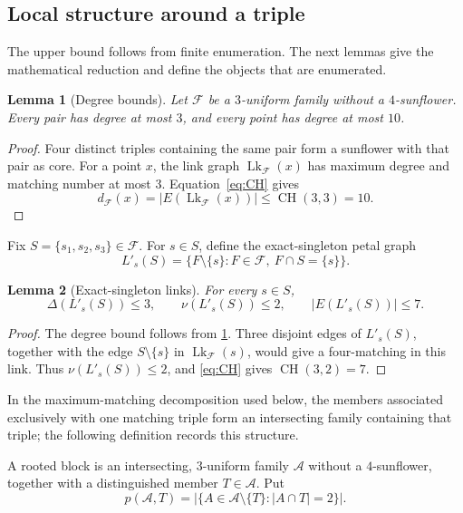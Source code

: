 \documentclass[11pt]{article}
\numberwithin{equation}{section}
\newtheorem{lemma}[lemma]{Lemma}
\theoremstyle{definition}
\theoremstyle{remark}
\newcommand{\F}{\mathcal F}
\newcommand{\A}{\mathcal A}
\newcommand{\CH}{\operatorname{CH}}
\newcommand{\Lk}{\operatorname{Lk}}
\begin{document}
\subsection{Local structure around a triple}

The upper bound follows from finite enumeration. The next lemmas give the
mathematical reduction and define the objects that are enumerated.

\begin{lemma}[Degree bounds]
\label{lem:f34-degrees}
Let $\F$ be a $3$-uniform family without a $4$-sunflower. Every pair has
degree at most $3$, and every point has degree at most $10$.
\end{lemma}

\begin{proof}
Four distinct triples containing the same pair form a sunflower with that pair
as core. For a point $x$, the link graph $\Lk_{\F}(x)$ has maximum degree and
matching number at most $3$. Equation~\eqref{eq:CH} gives
\[
 d_{\F}(x)=|E(\Lk_{\F}(x))|\le\CH(3,3)=10.
\]
\end{proof}

Fix $S=\{s_1,s_2,s_3\}\in\F$. For $s\in S$, define the exact-singleton
petal graph
\[
 L'_s(S)=\{F\setminus\{s\}:F\in\F,\ F\cap S=\{s\}\}.
\]

\begin{lemma}[Exact-singleton links]
\label{lem:f34-singlelink}
For every $s\in S$,
\[
 \Delta(L'_s(S))\le3,
 \qquad
 \nu(L'_s(S))\le2,
 \qquad
 |E(L'_s(S))|\le7.
\]
\end{lemma}

\begin{proof}
The degree bound follows from \cref{lem:f34-degrees}. Three disjoint edges of
$L'_s(S)$, together with the edge $S\setminus\{s\}$ in $\Lk_{\F}(s)$, would
give a four-matching in this link. Thus $\nu(L'_s(S))\le2$, and
\cref{eq:CH} gives $\CH(3,2)=7$.
\end{proof}

In the maximum-matching decomposition used below, the members associated
exclusively with one matching triple form an intersecting family containing
that triple; the following definition records this structure.

A rooted block is an intersecting, $3$-uniform family $\A$ without a
$4$-sunflower, together with a distinguished member $T\in\A$. Put
\[
 p(\A,T)=|\{A\in\A\setminus\{T\}:|A\cap T|=2\}|.
\]
\end{document}
